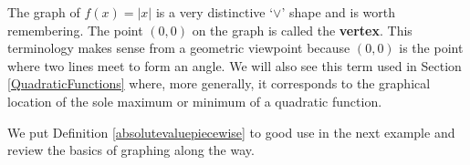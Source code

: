 \begin{center}
\begin{multicols}{3}
\end{multicols}

\end{center}

The graph of $f(x) = |x|$ is a very distinctive `$\vee$' shape and is worth remembering.  The point $(0, 0)$ on the graph is called the \textbf{vertex}.  This terminology makes sense from a geometric viewpoint because $(0, 0)$ is the point where two lines meet to form an angle.  We will also see this term used in Section \ref{QuadraticFunctions} where, more generally, it corresponds to the graphical location of the sole maximum or minimum of a quadratic function.

\medskip

We put Definition \ref{absolutevaluepiecewise} to good use in the next example and review the basics of graphing along the way.


